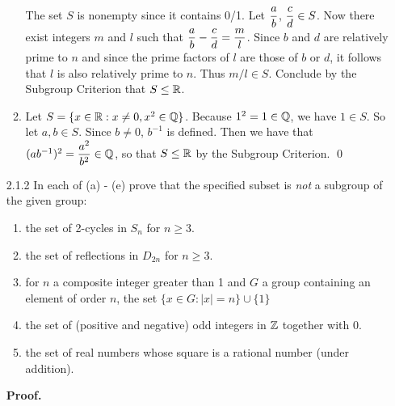 \begin{enumerate}
\begin{enumerate}
               The set $S$ is nonempty since it contains 0/1. Let
               $\displaystyle\frac{a}{b}$, $\displaystyle\frac{c}{d} \in S$. Now there exist integers
               $m$ and $l$ such that 
               $\displaystyle\frac{a}{b} - \frac{c}{d} = \frac{m}{l}$. Since $b$ and $d$
               are relatively prime to $n$ and since the prime factors of $l$
               are those of $b$ or $d$, it follows that $l$ is also relatively
               prime to $n$. Thus $m/l \in S$. Conclude by the Subgroup
               Criterion that $S \le \mathbb{R}$.
         \item Let $S = \{x \in \mathbb{R} : x \neq 0, x^2 \in \mathbb{Q}\}$. Because
               $1^2 = 1 \in \mathbb{Q}$, we have $1 \in S$. So let $a, b \in S$.
               Since $b \neq 0$, $b^{-1}$ is defined. Then we have that
               $(ab^{-1})^2 = \displaystyle\frac{a^2}{b^2} \in \mathbb{Q}$, so that $S \le \mathbb{R}$ by
               the Subgroup Criterion. \qed
      \end{enumerate} 
   \item[2.1.2]   In each of (a) - (e) prove that the specified subset is
                  \textit{not} a subgroup of the given group:
                  \begin{enumerate}
                     \item the set of 2-cycles in $S_n$ for $n \ge 3$.
                     \item the set of reflections in $D_{2n}$ for $n \ge 3$.
                     \item for $n$ a composite integer greater than 1 and $G$ a
                           group containing an element of order $n$, the set
                           $\{x \in G : |x| = n\} \cup \{1\}$
                     \item the set of (positive and negative) odd integers in
                           $\mathbb{Z}$ together with 0.
                     \item the set of real numbers whose square is a rational
                           number (under addition).
                  \end{enumerate}

      \textbf{Proof.}


\end{enumerate}
